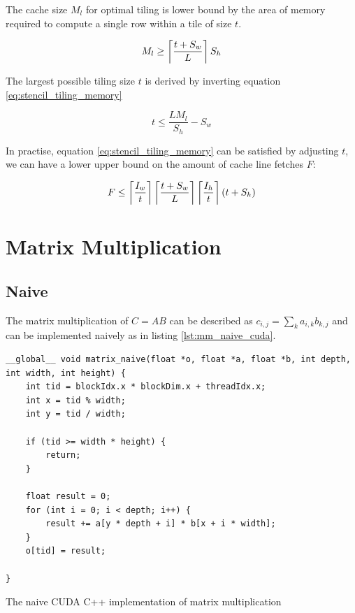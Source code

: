 The cache size $M_l$ for optimal tiling is lower bound by the area of memory required to compute a single row within a tile of size $t$.

\begin{equation}
    M_l \geq \left\lceil \frac{t + S_w}{L} \right\rceil S_h \label{eq:stencil_tiling_memory}
\end{equation}

The largest possible tiling size $t$ is derived by inverting equation \ref{eq:stencil_tiling_memory}

\begin{equation}
    t \leq \frac{L M_l}{S_h} - S_w
\end{equation}

In practise, equation \ref{eq:stencil_tiling_memory} can be satisfied by adjusting $t$, we can have a lower upper bound on the amount of cache line fetches $F$:

\begin{equation}
    F \leq \left\lceil \frac{I_w}{t} \right\rceil \left\lceil \frac{t + S_w}{L} \right\rceil \left\lceil \frac{I_h}{t} \right\rceil (t + S_h)
    \label{eq:stencil_tiling_fetches}
\end{equation}

\section{Matrix Multiplication}

\subsection{Naive}
\label{sec:matrix_naive}
The matrix multiplication of $C = AB$ can be described as $c_{i,j} = \sum_{k}a_{i,k}b_{k,j}$ and can be implemented naively as in listing \ref{lst:mm_naive_cuda}.

\begin{listing}[H]
    \begin{verbatim}
__global__ void matrix_naive(float *o, float *a, float *b, int depth, int width, int height) {
    int tid = blockIdx.x * blockDim.x + threadIdx.x;
    int x = tid % width;
    int y = tid / width;
    
    if (tid >= width * height) {
        return;
    }

    float result = 0;
    for (int i = 0; i < depth; i++) {
        result += a[y * depth + i] * b[x + i * width];
    }
    o[tid] = result;
    
}
    \end{verbatim}
    \caption{
        The naive CUDA C++ implementation of matrix multiplication
    }
    \label{lst:mm_naive_cuda}
\end{listing}

